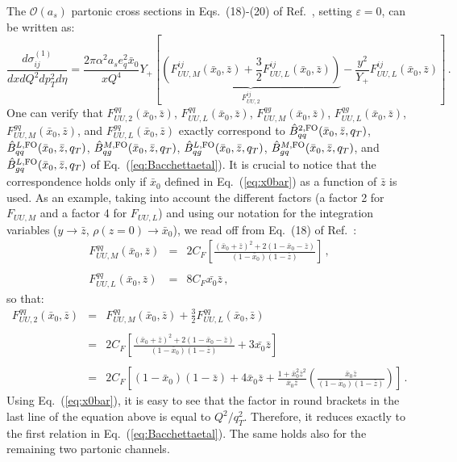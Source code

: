 \documentclass[10pt,a4paper]{article}
\begin{document}
The $\mathcal{O}(a_s)$ partonic cross sections in Eqs.~(18)-(20) of
Ref.~\cite{Daleo:2004pn}, setting $\varepsilon=0$, can be written as:
\begin{equation}
\frac{d\sigma_{ij}^{(1)}}{dxdQ^2d p_T^2 d\eta}=\frac{2\pi \alpha^2 a_s
  e_q^2\bar{x}_0}{x Q^4}Y_+ \left[ \underbrace{\left( F_{UU,M}^{ij}(\bar{x}_0,\bar{z})+\frac{3}{2}F_{UU,L}^{ij}(\bar{x}_0,\bar{z})\right)}_{F_{UU,2}^{ij}} - \frac{y^2}{Y_+}F_{UU,L}^{ij}(\bar{x}_0,\bar{z})\right]\,.
\end{equation}
One can verify that $F_{UU,2}^{qq}(\bar{x}_0,\bar{z})$,
$F_{UU,L}^{qq}(\bar{x}_0,\bar{z})$,
$F_{UU,M}^{qg}(\bar{x}_0,\bar{z})$,
$F_{UU,L}^{qg}(\bar{x}_0,\bar{z})$,
$F_{UU,M}^{gq}(\bar{x}_0,\bar{z})$, and
$F_{UU,L}^{gq}(\bar{x}_0,\bar{z})$ exactly correspond to
$\hat{B}^{2, \rm FO}_{qq}(\bar{x}_0,\bar{z},q_T)$,
$\hat{B}^{L, \rm FO}_{qq}(\bar{x}_0,\bar{z},q_T)$,
$\hat{B}^{M, \rm FO}_{qg}(\bar{x}_0,\bar{z},q_T)$,
$\hat{B}^{L, \rm FO}_{qg}(\bar{x}_0,\bar{z},q_T)$,
$\hat{B}^{M, \rm FO}_{gq}(\bar{x}_0,\bar{z},q_T)$, and
$\hat{B}^{L, \rm FO}_{gq}(\bar{x}_0,\bar{z},q_T)$ of
Eq.~(\ref{eq:Bacchettaetal}). It is crucial to notice that the
correspondence holds only if $\bar{x}_0$ defined in
Eq.~(\ref{eq:x0bar}) as a function of $\bar{z}$ is used. As an
example, taking into account the different factors (a factor 2 for
$F_{UU,M}$ and a factor 4 for $F_{UU,L}$) and using our notation for
the integration variables ($y\rightarrow \bar{z}$,
$\rho(z=0)\rightarrow \bar{x}_0$), we read off from Eq.~(18) of
Ref.~\cite{Daleo:2004pn}:
\begin{equation}
\begin{array}{rcl}
F_{UU,M}^{qq}(\bar{x}_0,\bar{z}) &=& \displaystyle 2C_F\left[\frac{(\bar{x}_0+\bar{z})^2+2(1-\bar{x}_0-\bar{z})}{(1-\bar{x}_0)(1-\bar{z})}\right]\,,\\
\\
F_{UU,L}^{qq}(\bar{x}_0,\bar{z}) &=& \displaystyle 8C_F\bar{x_0}\bar{z}\,,
\end{array}
\end{equation}
so that:
\begin{equation}
\begin{array}{rcl}
F_{UU,2}^{qq}(\bar{x}_0,\bar{z}) &=& F_{UU,M}^{qq}(\bar{x}_0,\bar{z})+\frac{3}{2}F_{UU,L}^{qq}(\bar{x}_0,\bar{z})\\
\\
 &=& \displaystyle 2
     C_F\left[\frac{(\bar{x}_0+\bar{z})^2+2(1-\bar{x}_0-\bar{z})}{(1-\bar{x}_0)(1-\bar{z})}
     + 3\bar{x_0}\bar{z}\right]\\
\\
&=& \displaystyle 2
     C_F\left[(1-\bar{x}_0)(1-\bar{z})+4\bar{x}_0\bar{z} +\frac{1+\bar{x}_0^2\bar{z}^2}{\bar{x}_0\bar{z}}\left(\frac{\bar{x}_0\bar{z}}{(1-\bar{x}_0)(1-\bar{z})}\right)\right]\,.
\end{array}
\end{equation}
Using Eq.~(\ref{eq:x0bar}), it is easy to see that the factor in round
brackets in the last line of the equation above is equal to
$Q^2/q_T^2$. Therefore, it reduces exactly to the first relation in
Eq.~(\ref{eq:Bacchettaetal}). The same holds also for the remaining
two partonic channels.
\end{document}
